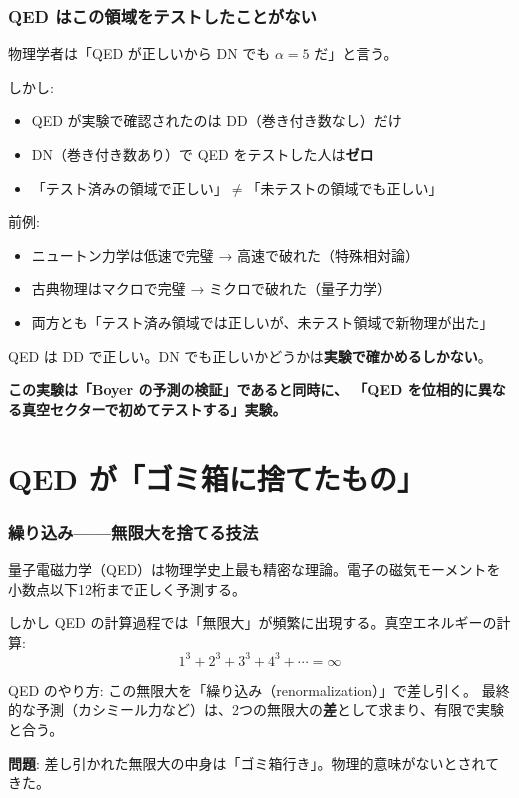 \documentclass[12pt,a4paper]{article}
\begin{document}
\section{QED はこの領域をテストしたことがない}

\begin{honestbox}[未踏領域]
物理学者は「QED が正しいから DN でも $\alpha = 5$ だ」と言う。

しかし:
\begin{itemize}
\item QED が実験で確認されたのは DD（巻き付き数なし）だけ
\item DN（巻き付き数あり）で QED をテストした人は\textbf{ゼロ}
\item 「テスト済みの領域で正しい」$\neq$「未テストの領域でも正しい」
\end{itemize}

前例:
\begin{itemize}
\item ニュートン力学は低速で完璧 → 高速で破れた（特殊相対論）
\item 古典物理はマクロで完璧 → ミクロで破れた（量子力学）
\item 両方とも「テスト済み領域では正しいが、未テスト領域で新物理が出た」
\end{itemize}

QED は DD で正しい。DN でも正しいかどうかは\textbf{実験で確かめるしかない}。

\textbf{この実験は「Boyer の予測の検証」であると同時に、
「QED を位相的に異なる真空セクターで初めてテストする」実験。}
\end{honestbox}

\part{QED が「ゴミ箱に捨てたもの」}

\section{繰り込み——無限大を捨てる技法}

\begin{storybox}
量子電磁力学（QED）は物理学史上最も精密な理論。電子の磁気モーメントを小数点以下12桁まで正しく予測する。

しかし QED の計算過程では「無限大」が頻繁に出現する。真空エネルギーの計算:
$$1^3 + 2^3 + 3^3 + 4^3 + \cdots = \infty$$

QED のやり方: この無限大を「繰り込み（renormalization）」で差し引く。
最終的な予測（カシミール力など）は、2つの無限大の\textbf{差}として求まり、有限で実験と合う。

\textbf{問題}: 差し引かれた無限大の中身は「ゴミ箱行き」。物理的意味がないとされてきた。
\end{storybox}
\end{document}
